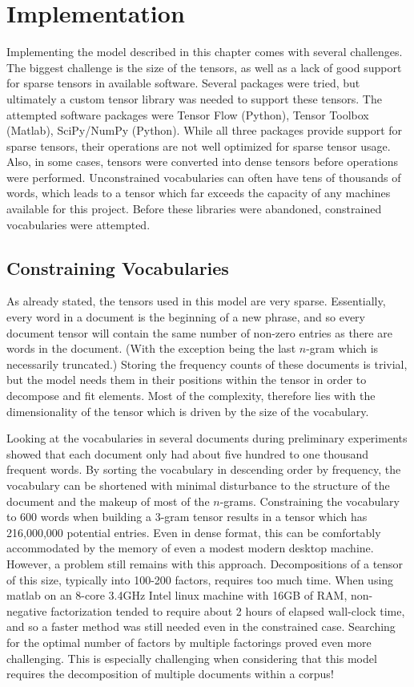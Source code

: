 \documentclass[../ut-dissertation.tex]{subfiles}
\begin{document}
\section{Implementation}
Implementing the model described in this chapter comes with several
challenges.  The biggest challenge is the size of the tensors, as well
as a lack of good support for sparse tensors in available software.
Several packages were tried, but ultimately a custom tensor library
was needed to support these tensors.  The attempted software packages
were Tensor Flow (Python), Tensor Toolbox (Matlab),  SciPy/NumPy
(Python).  While all three packages provide support for sparse
tensors, their operations are not well optimized for sparse tensor
usage.  Also, in some cases, tensors were converted into dense tensors
before operations were performed.  Unconstrained vocabularies can
often have tens of thousands of words, which leads to a tensor which
far exceeds the capacity of any machines available for this project.
Before these libraries were abandoned, constrained vocabularies were
attempted.

\subsection{Constraining Vocabularies}
As already stated, the tensors used in this model are very sparse.
Essentially, every word in a document is the beginning of a new
phrase, and so every document tensor will contain the same number of
non-zero entries as there are words in the document.  (With the
exception being the last $n$-gram which is necessarily truncated.)
Storing the frequency counts of these documents is trivial, but the
model needs them in their positions within the tensor in order to
decompose and fit elements.  Most of the complexity, therefore lies
with the dimensionality of the tensor which is driven by the size of
the vocabulary.

Looking at the vocabularies in several documents during preliminary
experiments showed that each document only had about five hundred to
one thousand frequent words.  By sorting the vocabulary in descending
order by frequency, the vocabulary can be shortened with minimal
disturbance to the structure of the document and the makeup of most of
the $n$-grams.  Constraining the vocabulary to 600 words when building
a 3-gram tensor results in a tensor which has 216,000,000 potential
entries.  Even in dense format, this can be comfortably accommodated
by the memory of even a modest modern desktop machine.  However, a
problem still remains with this approach.  Decompositions of a tensor
of this size, typically into 100-200 factors, requires too much time.
When using matlab on an 8-core 3.4GHz Intel linux machine with 16GB of
RAM, non-negative factorization tended to require about 2 hours of
elapsed wall-clock time, and so a faster method was still needed even
in the constrained case.  Searching for the optimal number of factors
by multiple factorings proved even more challenging.  This is
especially challenging when considering that this model requires the
decomposition of multiple documents within a corpus!
\end{document}
